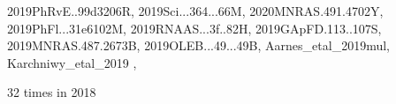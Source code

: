 \documentclass[12pt]{article}
\begin{document}
\begin{description}
{2019PhRvE..99d3206R,%
2019Sci...364...66M,%
2020MNRAS.491.4702Y,%
2019PhFl...31e6102M,%
2019RNAAS...3f..82H,%
2019GApFD.113..107S,%
2019MNRAS.487.2673B,%
2019OLEB...49...49B,%
Aarnes_etal_2019mul,%
Karchniwy_etal_2019%
},\item
\item %
32 times in 2018 \citep{
2018AN....339..127K,%
2018A&A...614A.101V,%
2018A&A...616A..72W,%
2018A&A...609A..51W,%
2018JAtS...75.3469L,%
2018ApJ...858..124S,%
2018arXiv181207916K,%
2018JPhCS1031a2007M,%
2018MNRAS.479.3923Z,%
2018A&A...618A..75S,%
2018RNAAS...2d.195L,%
2018AN....339..641B,%
2018ApJ...868...27Y,%
}
\end{description}
\end{document}
